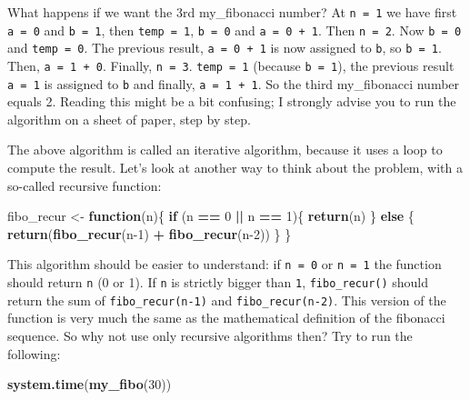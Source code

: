 \documentclass[]{gitbook}
\newenvironment{Shaded}{\begin{snugshade}}{\end{snugshade}}
\newcommand{\ControlFlowTok}[1]{\textcolor[rgb]{0.13,0.29,0.53}{\textbf{#1}}}
\newcommand{\DecValTok}[1]{\textcolor[rgb]{0.00,0.00,0.81}{#1}}
\newcommand{\KeywordTok}[1]{\textcolor[rgb]{0.13,0.29,0.53}{\textbf{#1}}}
\newcommand{\NormalTok}[1]{#1}
\newcommand{\OperatorTok}[1]{\textcolor[rgb]{0.81,0.36,0.00}{\textbf{#1}}}
\newcommand{\StringTok}[1]{\textcolor[rgb]{0.31,0.60,0.02}{#1}}
\begin{document}
What happens if we want the 3rd my\_fibonacci number? At \texttt{n\ =\ 1} we have first \texttt{a\ =\ 0} and \texttt{b\ =\ 1},
then \texttt{temp\ =\ 1}, \texttt{b\ =\ 0} and \texttt{a\ =\ 0\ +\ 1}. Then \texttt{n\ =\ 2}. Now \texttt{b\ =\ 0} and \texttt{temp\ =\ 0}. The previous
result, \texttt{a\ =\ 0\ +\ 1} is now assigned to \texttt{b}, so \texttt{b\ =\ 1}. Then, \texttt{a\ =\ 1\ +\ 0}. Finally, \texttt{n\ =\ 3}. \texttt{temp\ =\ 1} (because \texttt{b\ =\ 1}), the previous result \texttt{a\ =\ 1} is assigned to \texttt{b} and finally, \texttt{a\ =\ 1\ +\ 1}. So
the third my\_fibonacci number equals 2. Reading this might be a bit confusing; I strongly advise you
to run the algorithm on a sheet of paper, step by step.

The above algorithm is called an iterative algorithm, because it uses a loop to compute the result.
Let's look at another way to think about the problem, with a so-called recursive function:

\begin{Shaded}
\begin{Highlighting}[]
\NormalTok{fibo_recur <-}\StringTok{ }\ControlFlowTok{function}\NormalTok{(n)\{}
 \ControlFlowTok{if}\NormalTok{ (n }\OperatorTok{==}\StringTok{ }\DecValTok{0} \OperatorTok{||}\StringTok{ }\NormalTok{n }\OperatorTok{==}\StringTok{ }\DecValTok{1}\NormalTok{)\{}
   \KeywordTok{return}\NormalTok{(n)}
\NormalTok{   \} }\ControlFlowTok{else}\NormalTok{ \{}
     \KeywordTok{return}\NormalTok{(}\KeywordTok{fibo_recur}\NormalTok{(n}\DecValTok{-1}\NormalTok{) }\OperatorTok{+}\StringTok{ }\KeywordTok{fibo_recur}\NormalTok{(n}\DecValTok{-2}\NormalTok{))}
\NormalTok{   \}}
\NormalTok{\}}
\end{Highlighting}
\end{Shaded}

This algorithm should be easier to understand: if \texttt{n\ =\ 0} or \texttt{n\ =\ 1} the function should return \texttt{n}
(0 or 1). If \texttt{n} is strictly bigger than \texttt{1}, \texttt{fibo\_recur()} should return the sum of
\texttt{fibo\_recur(n-1)} and \texttt{fibo\_recur(n-2)}. This version of the function is very much the same as the
mathematical definition of the fibonacci sequence. So why not use only recursive algorithms
then? Try to run the following:

\begin{Shaded}
\begin{Highlighting}[]
\KeywordTok{system.time}\NormalTok{(}\KeywordTok{my_fibo}\NormalTok{(}\DecValTok{30}\NormalTok{))}
\end{Highlighting}
\end{Shaded}
\end{document}
